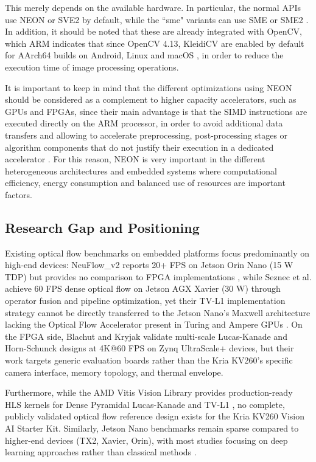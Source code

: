 \documentclass[conference]{IEEEtran}
\begin{document}
This merely depends on the available hardware. In particular, the normal APIs use NEON or SVE2 by default, while the “sme" variants can use SME or SME2 \cite{ref5}. In addition, it should be noted that these are already integrated with OpenCV, which ARM indicates that since OpenCV 4.13, KleidiCV are enabled by default for AArch64 builds on Android, Linux and macOS \cite{ref5}, in order to reduce the execution time of image processing operations.

It is important to keep in mind that the different optimizations using NEON should be considered as a complement to higher capacity accelerators, such as GPUs and FPGAs, since their main advantage is that the SIMD instructions are executed directly on the ARM processor, in order to avoid additional data transfers and allowing to accelerate preprocessing, post-processing stages or algorithm components that do not justify their execution in a dedicated accelerator \cite{ref26,ref31}. For this reason, NEON is very important in the different heterogeneous architectures and embedded systems where computational efficiency, energy consumption and balanced use of resources are important factors.

\subsection{Research Gap and Positioning}


Existing optical flow benchmarks on embedded platforms focus predominantly on high-end devices: NeuFlow\_v2 reports 20+ FPS on Jetson Orin Nano (15 W TDP) but provides no comparison to FPGA implementations \cite{ref3}, while Seznec et al. \cite{ref25} achieve 60 FPS dense optical flow on Jetson AGX Xavier (30 W) through operator fusion and pipeline optimization, yet their TV-L1 implementation strategy cannot be directly transferred to the Jetson Nano's Maxwell architecture lacking the Optical Flow Accelerator present in Turing and Ampere GPUs \cite{ref20,ref24}. On the FPGA side, Blachut and Kryjak \cite{ref13,ref36} validate multi-scale Lucas-Kanade and Horn-Schunck designs at 4K@60 FPS on Zynq UltraScale+ devices, but their work targets generic evaluation boards rather than the Kria KV260's specific camera interface, memory topology, and thermal envelope.

Furthermore, while the AMD Vitis Vision Library provides production-ready HLS kernels for Dense Pyramidal Lucas-Kanade and TV-L1 \cite{ref6,ref17}, no complete, publicly validated optical flow reference design exists for the Kria KV260 Vision AI Starter Kit. Similarly, Jetson Nano benchmarks remain sparse compared to higher-end devices (TX2, Xavier, Orin), with most studies focusing on deep learning approaches rather than classical methods \cite{ref25,ref38}.
\end{document}
